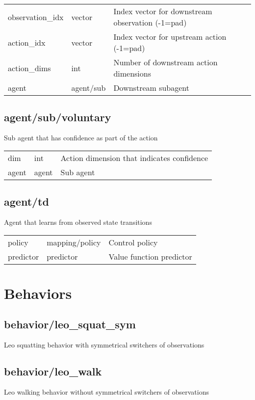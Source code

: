 \noindent\begin{tabular}{@{}lll@{}}
observation\_idx&vector&Index vector for downstream observation (-1=pad)\\
action\_idx&vector&Index vector for upstream action (-1=pad)\\
action\_dims&int&Number of downstream action dimensions\\
agent&agent/sub&Downstream subagent\\
\end{tabular}
\subsection{agent/sub/voluntary}
\noindent Sub agent that has confidence as part of the action\\

\noindent\begin{tabular}{@{}lll@{}}
dim&int&Action dimension that indicates confidence\\
agent&agent&Sub agent\\
\end{tabular}
\subsection{agent/td}
\noindent Agent that learns from observed state transitions\\

\noindent\begin{tabular}{@{}lll@{}}
policy&mapping/policy&Control policy\\
predictor&predictor&Value function predictor\\
\end{tabular}
\section{Behaviors}
\subsection{behavior/leo\_squat\_sym}
\noindent Leo squatting behavior with symmetrical switchers of observations\\

\subsection{behavior/leo\_walk}
\noindent Leo walking behavior without symmetrical switchers of observations\\


